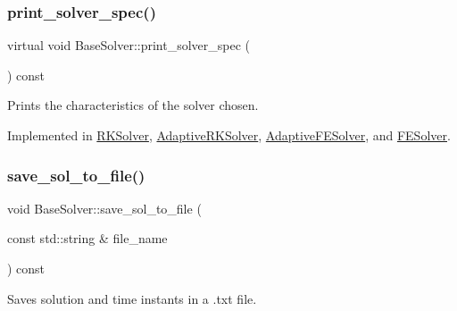 \mbox{\label{classBaseSolver_a44725e315b208c0ee69ba8fd5d172e09}} 
\subsubsection{\texorpdfstring{print\+\_\+solver\+\_\+spec()}{print\_solver\_spec()}}
{\footnotesize\ttfamily virtual void Base\+Solver\+::print\+\_\+solver\+\_\+spec (\begin{DoxyParamCaption}{ }\end{DoxyParamCaption}) const\hspace{0.3cm}{\ttfamily [pure virtual]}}



Prints the characteristics of the solver chosen. 



Implemented in \hyperlink{classRKSolver_af7ec0ddafd838e03c9db344a2abd8674}{R\+K\+Solver}, \hyperlink{classAdaptiveRKSolver_aba981c5c2b0816506bc3a2e1c21d5bc9}{Adaptive\+R\+K\+Solver}, \hyperlink{classAdaptiveFESolver_a8d15ec3bd7db8e46eca25382ba8130ae}{Adaptive\+F\+E\+Solver}, and \hyperlink{classFESolver_a46f8b70e97141583f68c5dfeb79e80c8}{F\+E\+Solver}.

\mbox{\label{classBaseSolver_a083167190cdd436c2a5aa60cbb58d904}} 
\subsubsection{\texorpdfstring{save\+\_\+sol\+\_\+to\+\_\+file()}{save\_sol\_to\_file()}}
{\footnotesize\ttfamily void Base\+Solver\+::save\+\_\+sol\+\_\+to\+\_\+file (\begin{DoxyParamCaption}\item[{const std\+::string \&}]{file\+\_\+name }\end{DoxyParamCaption}) const\hspace{0.3cm}{\ttfamily [virtual]}}



Saves solution and time instants in a .txt file. 

